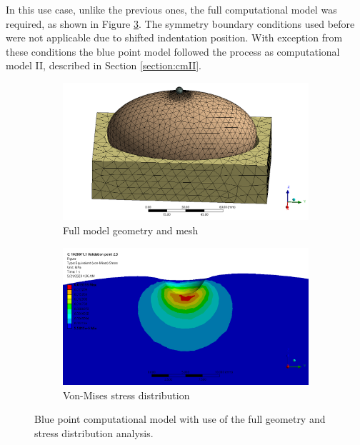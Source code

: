 In this use case, unlike the previous ones, the full computational model was required, as shown in Figure \ref{fig:bluepointcm}.
The symmetry boundary conditions used before were not applicable due to shifted indentation position.
With exception from these conditions the blue point model followed the process as computational model II, described 
in Section \ref{section:cmII}.

\begin{figure}
    \centering
    \begin{subfigure}[b]{0.5\textwidth}
    \centering
    \includegraphics[width=\textwidth]{Images/validationcase/bluepoint/bluepointmesh.png}
    \caption{Full model geometry and mesh}
    \label{fig:bluepointgeoandmesh}
    \end{subfigure}
    \hfill
    \begin{subfigure}[b]{0.5\textwidth}
    \centering
    \includegraphics[width=\textwidth]{Images/validationcase/bluepoint/bluepointstress3.png}
    \caption{Von-Mises stress distribution}
    \label{fig:bluepointstress}
    \end{subfigure}
    \hspace{0.3cm}
    \caption[Blue point computational model]{Blue point computational model with use of the full geometry and stress distribution analysis.}
    \label{fig:bluepointcm}
\end{figure}

